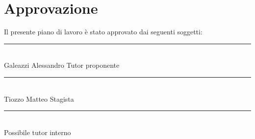 \section*{Approvazione}
Il presente piano di lavoro è stato approvato dai seguenti soggetti:

\vspace{3cm}

\begin{flushleft}
    \rule{0.6\linewidth}{0.3mm} \\

    Galeazzi Alessandro \hspace{2cm} Tutor proponente 

    \vspace{3cm}

    \rule{0.6\linewidth}{0.3mm} \\ 

    Tiozzo Matteo \hspace{3.3cm} Stagista 

    \vspace{3cm}

    \rule{0.6\linewidth}{0.3mm} \\ 

    Possibile tutor interno
\end{flushleft}



